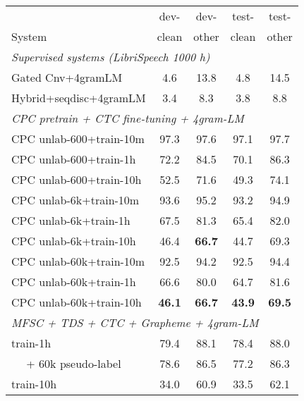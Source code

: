 \documentclass{article}
\begin{document}
\begin{table}[h]
\begin{tabular}{l @{\hspace{0.6\tabcolsep}} c @{\hspace{0.6\tabcolsep}} c @{\hspace{0.8\tabcolsep}} c @{\hspace{0.6\tabcolsep}} c}
\toprule
                      &dev-  &dev- &test-  &test-\\
System                & clean&other&clean&other\\
\midrule
\midrule
\multicolumn{5}{l}{\textit{Supervised systems (LibriSpeech 1000 h)}} \\
Gated Cnv+4gramLM\cite{liptchinsky2017based}    &  4.6  &  13.8 &  4.8  &  14.5    \\
Hybrid+seqdisc+4gramLM\cite{luscher2019rwth}   &   3.4  & 8.3   &   3.8 &   8.8    \\
\midrule
\midrule
\multicolumn{5}{l}{\textit{CPC pretrain + CTC fine-tuning + 4gram-LM}}   \\
CPC unlab-600+train-10m    &     97.3  &     97.6  &     97.1  &   97.7  \\
CPC unlab-600+train-1h     &     72.2  &     84.5  &    70.1  &   86.3  \\
CPC unlab-600+train-10h    &     52.5  &     71.6  &     49.3  &   74.1  \\
\midrule
CPC unlab-6k+train-10m     &     93.6  &     95.2  &     93.2  &   94.9  \\
CPC unlab-6k+train-1h      &     67.5  &     81.3  &     65.4  &   82.0  \\
CPC unlab-6k+train-10h     &     46.4  &    \bf 66.7  &  44.7  &   69.3  \\
\midrule
CPC unlab-60k+train-10m    &     92.5  &    94.2  &     92.5  &     94.4 \\
CPC unlab-60k+train-1h     &     66.6  &     80.0  &     64.7  &     81.6 \\
CPC unlab-60k+train-10h    & \bf 46.1  & \bf 66.7  & \bf 43.9  & \bf 69.5 \\
\midrule
\midrule \multicolumn{5}{l}{\textit{MFSC + TDS + CTC + Grapheme + 4gram-LM}} \\
train-1h               &    79.4     &     88.1    &      78.4    &      88.0   \\
~~ + 60k pseudo-label  &    78.6     &     86.5    &      77.2    &      86.3   \\
train-10h              &    34.0     &     60.9    &      33.5    &      62.1   \\

\end{tabular}
\end{table}
\end{document}

